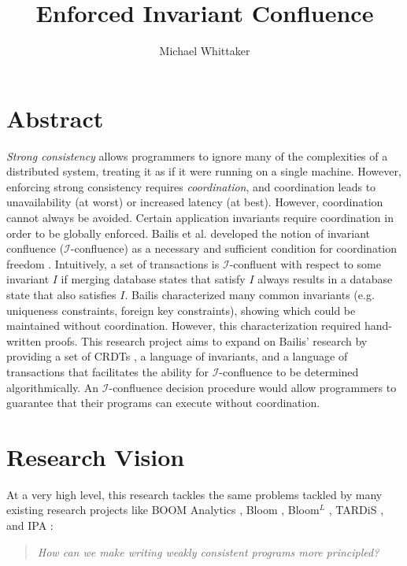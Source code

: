 \documentclass{tex/mjw}
\title{Enforced Invariant Confluence}
\author{Michael Whittaker}
\newcommand{\iinvariant}{\mathcal{I}}
\newcommand{\iconfluent}{$\iinvariant$-confluent}
\newcommand{\iconfluence}{$\iinvariant$-confluence}
\begin{document}
\maketitle

\section{Abstract}
\emph{Strong consistency} allows programmers to ignore many of the complexities
of a distributed system, treating it as if it were running on a single machine.
However, enforcing strong consistency requires \emph{coordination}, and
coordination leads to unavailability \cite{gilbert2002brewer} (at worst) or
increased latency (at best). However, coordination cannot always be avoided.
Certain application invariants require coordination in order to be globally
enforced. Bailis et al. developed the notion of invariant confluence
(\iconfluence{}) as a necessary and sufficient condition for coordination
freedom \cite{bailis2014coordination}. Intuitively, a set of transactions is
\iconfluent{} with respect to some invariant $I$ if merging database states
that satisfy $I$ always results in a database state that also satisfies $I$.
Bailis characterized many common invariants (e.g. uniqueness constraints,
foreign key constraints), showing which could be maintained without
coordination. However, this characterization required hand-written proofs. This
research project aims to expand on Bailis' research by providing a set of
CRDTs \cite{shapiro2011comprehensive, shapiro2011conflict}, a language of
invariants, and a language of transactions that facilitates the ability for
\iconfluence{} to be determined algorithmically. An \iconfluence{} decision
procedure would allow programmers to guarantee that their programs can execute
without coordination.

\section{Research Vision}
At a very high level, this research tackles the same problems tackled by many
existing research projects like BOOM Analytics \cite{alvaro2010boom}, Bloom
\cite{alvaro2011consistency}, Bloom$^L$ \cite{conway2012logic}, TARDiS
\cite{crookstardis}, and IPA \cite{holt2016disciplined}:

\begin{quotation}
  \emph{How can we make writing weakly consistent programs more principled?}
\end{quotation}
\end{document}
